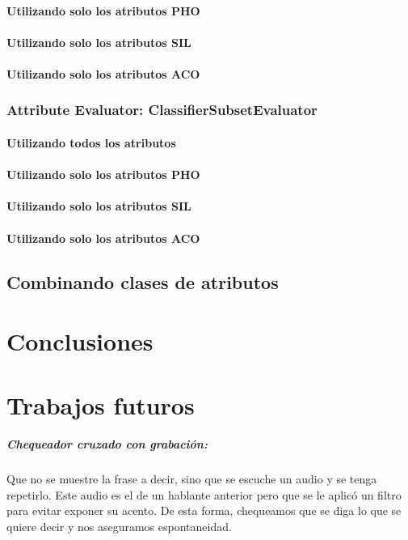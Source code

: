 \documentclass[11pt,a4paper,twoside]{tesis}
\begin{document}
\subsubsection{Utilizando solo los atributos PHO}
\subsubsection{Utilizando solo los atributos SIL}
\subsubsection{Utilizando solo los atributos ACO}

\subsection*{Attribute Evaluator: ClassifierSubsetEvaluator}

\subsubsection{Utilizando todos los atributos}
\subsubsection{Utilizando solo los atributos PHO}
\subsubsection{Utilizando solo los atributos SIL}
\subsubsection{Utilizando solo los atributos ACO}

\section{Combinando clases de atributos}


\chapter{Conclusiones}
\chapter{Trabajos futuros}

\paragraph*{Chequeador cruzado con grabación:} Que no se muestre la frase a decir, sino que se escuche un audio y se tenga repetirlo. Este audio es el de un hablante anterior pero que se le aplicó un filtro para evitar exponer su acento. De esta forma, chequeamos que se diga lo que se quiere decir y nos aseguramos espontaneidad.
\end{document}
